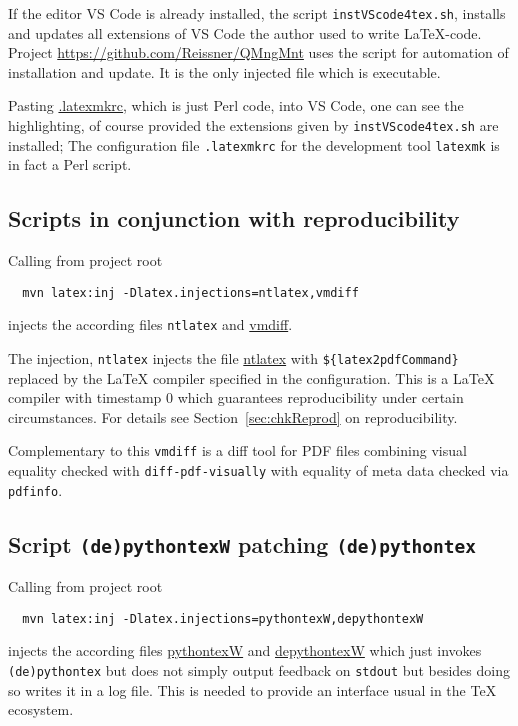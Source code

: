 If the editor VS Code is already installed, 
the script \texttt{instVScode4tex.sh}, 
installs and updates all extensions of VS Code the author used to write \LaTeX-code. 
Project \url{https://github.com/Reissner/QMngMnt} 
uses the script for automation of installation and update. 
It is the only injected file which is executable. 

Pasting \href{\urlSite fromTex/.latexmkrc}{.latexmkrc}, 
which is just Perl code, 
into VS Code, one can see the highlighting, 
of course provided the extensions given by \texttt{instVScode4tex.sh} are installed; 
The configuration file \texttt{.latexmkrc} 
for the development tool \texttt{latexmk} is in fact a Perl script. 


\subsection{Scripts in conjunction with reproducibility }\label{subsec:ntlatexVmdiff}

Calling from project root 
%
\begin{Verbatim}
  mvn latex:inj -Dlatex.injections=ntlatex,vmdiff
\end{Verbatim}
%
injects the according files 
\texttt{ntlatex} and \href{\urlSite fromMain/ntlatex}{vmdiff}. 

The injection, \texttt{ntlatex} 
injects the file \href{\urlSite fromMain/ntlatex}{ntlatex} 
with \texttt{\$\{latex2pdfCommand\}} 
replaced by the \LaTeX{} compiler specified in the configuration. 
This is a \LaTeX{} compiler with timestamp 0 which guarantees reproducibility 
under certain circumstances. 
For details see Section~\ref{sec:chkReprod} on reproducibility. 

Complementary to this \texttt{vmdiff} is a diff tool for PDF files 
combining visual equality checked with \texttt{diff-pdf-visually} 
with equality of meta data checked via \texttt{pdfinfo}. 

\subsection{Script \texttt{(de)pythontexW} patching \texttt{(de)pythontex} }\label{subsec:pythontexW}

Calling from project root 
%
\begin{Verbatim}
  mvn latex:inj -Dlatex.injections=pythontexW,depythontexW
\end{Verbatim}
%
injects the according files 
\href{\urlSite fromMain/pythontexW}{pythontexW} and 
\href{\urlSite fromMain/depythontexW}{depythontexW}
which just invokes \texttt{(de)pythontex} 
but does not simply output feedback on \texttt{stdout}
but besides doing so writes it in a log file. 
This is needed to provide an interface usual in the \TeX{} ecosystem. 

